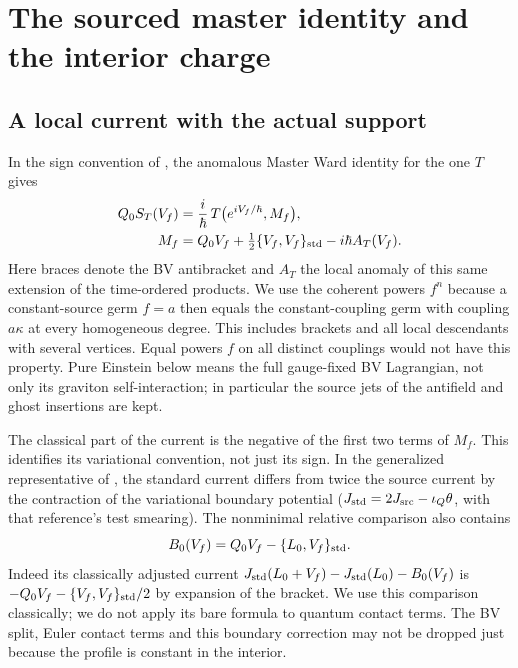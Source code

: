\section{The sourced master identity and the interior charge}\label{sec:ward}

\subsection{A local current with the actual support}

In the sign convention of \cite[Lemma~4.8, Thm.~4.16]{RS}, the anomalous Master Ward identity for the one \(T\) gives
\begin{align}
 Q_0 S_T(V_f)
  &=\frac{i}{\hbar}\,T\bigl(e^{iV_f/\hbar},M_f\bigr),\nonumber\\
 M_f&=Q_0 V_f+\tfrac12\{V_f,V_f\}_{\rm std}
                  -i\hbar A_T(V_f).
 \label{eq:AWI}
\end{align}
Here braces denote the BV antibracket and \(A_T\) the local anomaly of this same extension of the time-ordered products. We use the coherent powers \(f^n\) because a constant-source germ \(f=a\) then equals the constant-coupling germ with coupling \(a\kappa\) at every homogeneous degree. This includes brackets and all local descendants with several vertices. Equal powers \(f\) on all distinct couplings would not have this property. Pure Einstein below means the full gauge-fixed BV Lagrangian, not only its graviton self-interaction; in particular the source jets of the antifield and ghost insertions are kept.

The classical part of the current is the negative of the first two terms of \(M_f\). This identifies its variational convention, not just its sign. In the generalized representative of \cite[Props.~4.3, 4.9]{RS}, the standard current differs from twice the source current by the contraction of the variational boundary potential (\(J_{\rm std}=2J_{\rm src}-\iota_Q\theta\), with that reference's test smearing). The nonminimal relative comparison also contains
\[
     B_0(V_f)=Q_0V_f-\{L_0,V_f\}_{\rm std}.
\]
Indeed its classically adjusted current
\(J_{\rm std}(L_0+V_f)-J_{\rm std}(L_0)-B_0(V_f)\)
is \(-Q_0V_f-\{V_f,V_f\}_{\rm std}/2\) by expansion of the bracket. We use this comparison classically; we do not apply its bare formula to quantum contact terms. The BV split, Euler contact terms and this boundary correction may not be dropped just because the profile is constant in the interior.


